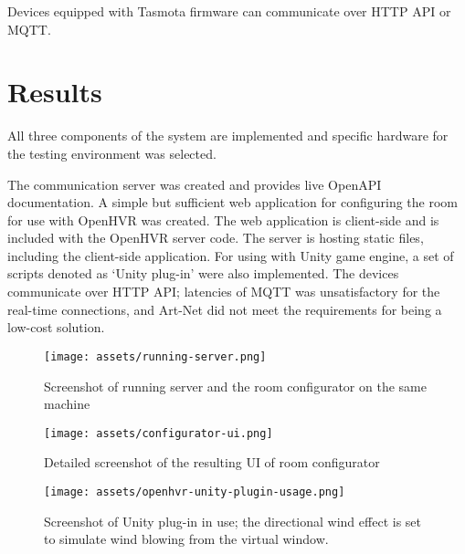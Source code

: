 Devices equipped with Tasmota firmware can communicate over HTTP API or MQTT.

\hypertarget{x-results}{\section{Results}}
All three components of the system are implemented and specific hardware
for the testing environment was selected.


The communication server was created and provides live OpenAPI documentation.
A simple but sufficient web application for configuring the room for use with
OpenHVR was created. The web application is client-side and is included with
the OpenHVR server code. The server is hosting static files,
including the client-side application.
For using with Unity game engine, a set of scripts denoted as `Unity plug-in'
were also implemented. The devices communicate over HTTP API;
latencies of MQTT was unsatisfactory for the real-time connections, and Art-Net
did not meet the requirements for being a low-cost solution.

\begin{figure}[h]{}
\centering\texttt{[image: assets/running-server.png]}
\caption{Screenshot of running server and the room configurator on the same machine}
\end{figure}

\begin{figure}[h]{}
\centering\texttt{[image: assets/configurator-ui.png]}
\caption{Detailed screenshot of the resulting UI of room configurator}
\end{figure}

\begin{figure}[h]{}
\centering\texttt{[image: assets/openhvr-unity-plugin-usage.png]}
\caption{Screenshot of Unity plug-in in use; the directional wind effect is set to simulate wind blowing from the virtual window.}
\end{figure}
